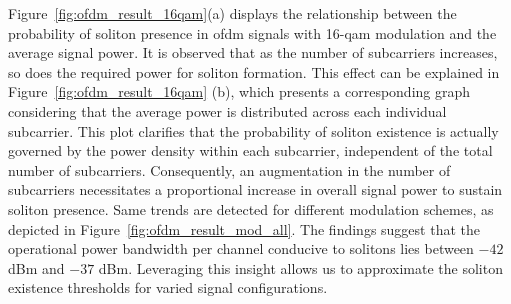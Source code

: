 Figure~\ref{fig:ofdm_result_16qam}(a) displays the relationship between the probability of soliton presence in \acrshort{ofdm} signals with 16-\acrshort{qam} modulation and the average signal power. It is observed that as the number of subcarriers increases, so does the required power for soliton formation. This effect can be explained in Figure~\ref{fig:ofdm_result_16qam} (b), which presents a corresponding graph considering that the average power is distributed across each individual subcarrier. This plot clarifies that the probability of soliton existence is actually governed by the power density within each subcarrier, independent of the total number of subcarriers. Consequently, an augmentation in the number of subcarriers necessitates a proportional increase in overall signal power to sustain soliton presence. Same trends are detected for different modulation schemes, as depicted in Figure~\ref{fig:ofdm_result_mod_all}. The findings suggest that the operational power bandwidth per channel conducive to solitons lies between \(-42\) dBm and \(-37\) dBm. Leveraging this insight allows us to approximate the soliton existence thresholds for varied signal configurations.


